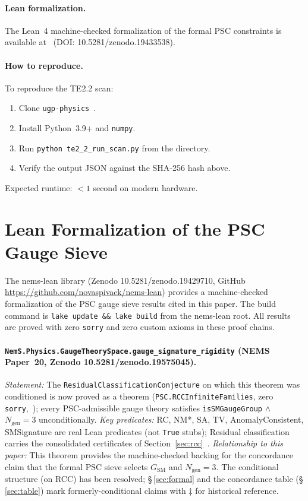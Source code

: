 \documentclass[11pt,twocolumn]{article}
\theoremstyle{remark}
\begin{document}
\paragraph{Lean formalization.}
The Lean~4 machine-checked formalization of the formal PSC constraints
is available at~\cite{SpivackUGPFormalization} (DOI:
10.5281/zenodo.19433538).

\paragraph{How to reproduce.}
To reproduce the TE2.2 scan:
\begin{enumerate}
  \item Clone \texttt{ugp-physics}~\cite{ugp-physics-repo}.
  \item Install Python~3.9+ and \texttt{numpy}.
  \item Run \texttt{python te2\_2\_run\_scan.py} from the
        directory.
  \item Verify the output JSON against the SHA-256 hash above.
\end{enumerate}
Expected runtime: $<1$ second on modern hardware.

\section{Lean Formalization of the PSC Gauge Sieve}
\label{app:lean}

The nems-lean library (Zenodo 10.5281/zenodo.19429710,
GitHub \url{https://github.com/novaspivack/nems-lean}) provides a
machine-checked formalization of the PSC gauge sieve results cited in
this paper. The build command is \texttt{lake update \&\& lake build}
from the nems-lean root. All results are proved with zero
\texttt{sorry} and zero custom axioms in these proof chains.

\paragraph{\texttt{NemS.Physics.\allowbreak{}GaugeTheorySpace.\allowbreak{}gauge\_\allowbreak{}signature\_\allowbreak{}rigidity}
(NEMS Paper~20, Zenodo 10.5281/zenodo.\allowbreak{}19575045).}
\textit{Statement:} The \texttt{ResidualClassificationConjecture} on which this theorem was conditioned is now proved as a theorem (\texttt{PSC.RCCInfiniteFamilies}, zero \texttt{sorry},~\cite{ugp-lean}); every
PSC-admissible gauge theory satisfies \texttt{isSMGaugeGroup}
$\wedge$ $N_{\mathrm{gen}}=3$ unconditionally.
\textit{Key predicates:} RC, NM*, SA, TV, AnomalyConsistent,
SMSignature are real Lean predicates (not \texttt{True} stubs);
Residual classification carries the consolidated certificates of Section~\ref{sec:rcc}~\cite{ugp-lean}.
\textit{Relationship to this paper:} This theorem provides the
machine-checked backing for the concordance claim that the formal PSC
sieve selects $G_{\mathrm{SM}}$ and $N_{\mathrm{gen}}=3$.
The conditional structure (on RCC) has been resolved; \S\,\ref{sec:formal}
and the concordance table (\S\,\ref{sec:table}) mark formerly-conditional claims
with $\ddagger$ for historical reference.
\end{document}
